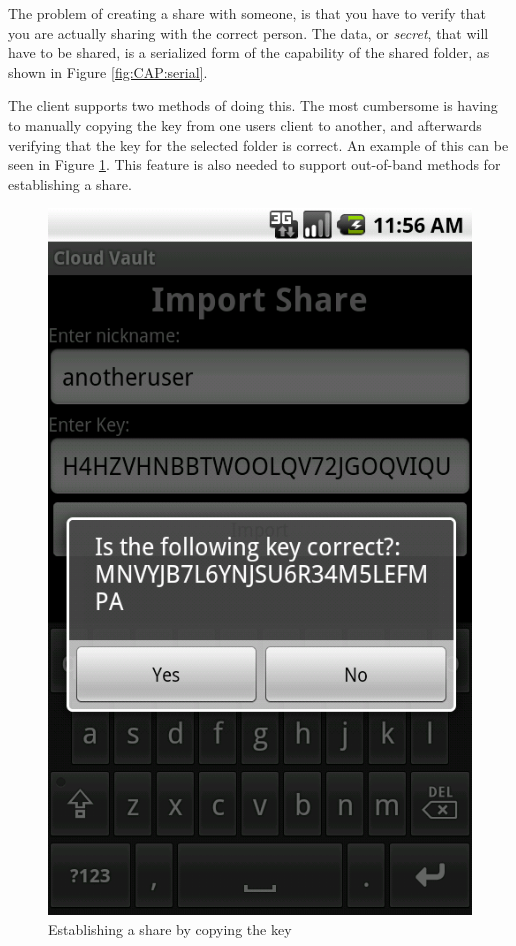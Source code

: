 \documentclass[pdftex,english,10pt,b5paper,twoside]{book}
\begin{document}
The problem of creating a share with someone, is that you have to verify that
you are actually sharing with the correct person. The data, or \emph{secret},
that will have to be shared, is a serialized form of the capability of the
shared folder, as shown in Figure \ref{fig:CAP:serial}.

The client supports two methods of doing this. The most cumbersome
is having to manually copying the key from one users client to another, and
afterwards verifying that the key for the selected folder is correct. An example
of this can be seen in Figure \ref{fig:CSVAndroid:manualimport}. This feature
is also needed to support out-of-band methods for establishing a share.

\begin{figure}[h!]
    \centering
    \includegraphics[scale=0.4]{client-manualimport.png}
    \caption{Establishing a share by copying the key}
    \label{fig:CSVAndroid:manualimport}
\end{figure}
\end{document}
